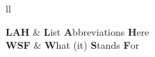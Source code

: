 \documentclass[
12pt, %
english, %
singlespacing, %
liststotoc, %
parskip, %
headsepline, %
openany,
]{MastersDoctoralThesis} %
\numberwithin{theorem}{section}
\numberwithin{remark}{section}
\numberwithin{assumption}{section}
\begin{document}
\listoffigures %

\listoftables %

\listofalgorithms %


\begin{abbreviations}{ll} %

\textbf{LAH} & \textbf{L}ist \textbf{A}bbreviations \textbf{H}ere\\
\textbf{WSF} & \textbf{W}hat (it) \textbf{S}tands \textbf{F}or\\

\end{abbreviations}


%
%
%


%
%
%
%
\end{document}
